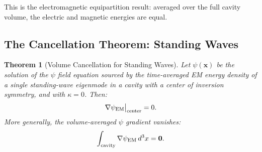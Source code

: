 \documentclass[aps,prd,twocolumn,superscriptaddress,floatfix,nofootinbib]{revtex4-2}
\newcommand{\kap}{\kappa}
\newtheorem{theorem}{Theorem}
\begin{document}
This is the electromagnetic equipartition result: averaged over the
full cavity volume, the electric and magnetic energies are equal.

\subsection{The Cancellation Theorem: Standing Waves}
\label{sec:cancellation-proof}

\begin{theorem}[Volume Cancellation for Standing Waves]
\label{thm:cancellation}
Let $\psi(\mathbf{x})$ be the solution of the $\psi$ field equation
sourced by the time-averaged EM energy density of a single standing-wave
eigenmode in a cavity with a center of inversion symmetry, and with
$\kap = 0$. Then:
\begin{equation}
\nabla\psi_{\rm EM}\big|_{\rm center} = 0.
\end{equation}
More generally, the volume-averaged $\psi$ gradient vanishes:
\begin{equation}
\int_{\rm cavity}\nabla\psi_{\rm EM}\,d^3x = \mathbf{0}.
\label{eq:cancellation-result}
\end{equation}
\end{theorem}
\end{document}
